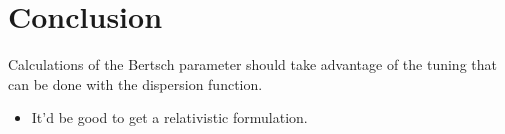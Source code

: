 \section{Conclusion}\label{sec:conclusion}

Calculations of the Bertsch parameter should take advantage of the tuning that can be done with the dispersion function.

\begin{itemize}
    \item It'd be good to get a relativistic formulation.
\end{itemize}
